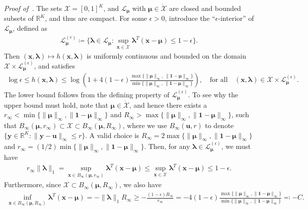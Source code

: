 \documentclass{article}
\theoremstyle{plain}
\theoremstyle{definition}
\newcommand{\lrp}[1]{\left( #1 \right)}
\newcommand{\R}{\mathbb{R}}
\newcommand{\calX}{\mathcal X}
\newcommand{\calL}{\mathcal L}
\newcommand{\uvec}{\mathbf{u}}
\newcommand{\xvec}{\mathbf{x}}
\newcommand{\yvec}{\mathbf{y}}
\newcommand{\qtext}[1]{\quad \text{#1} \quad}
\newcommand{\boldlambda}{\boldsymbol{\lambda}}
\newcommand{\boldmu}{\boldsymbol{\mu}}
\newcommand{\dualdomain}{\calL_{\boldmu}}
\newcommand{\epsdualdomain}{\calL_{\boldmu}^{(\epsilon)}}
\begin{document}
\emph{Proof of~.}
The sets $\calX = [0,1]^K$, and $\calL_{\boldmu}$ with $\boldmu \in \mathring{\calX}$ are closed and bounded subsets of $\R^K$, and thus are compact. For some $\epsilon>0$, introduce the ``$\epsilon$-interior'' of $\dualdomain$, defined as
\begin{align}
    \epsdualdomain \coloneqq \{ \boldlambda \in \dualdomain: \sup_{\xvec\in \calX} \boldlambda^T(\xvec-\boldmu) \leq 1-\epsilon\}.  \label{eq:epsilon-interior}
\end{align}
Then $(\xvec, \boldlambda) \mapsto h(\xvec, \boldlambda)$ is uniformly continuous and bounded on the domain $\calX \times \epsdualdomain$, and satisfies 
\begin{align}
    \log \epsilon \leq h(\xvec, \boldlambda) \leq \log\lrp{1 + 4(1-\epsilon) \frac{\max\{ \|\boldmu\|_\infty, \, \|\boldsymbol{1}-\boldmu\|_\infty \} }{\min\{ \|\boldmu\|_\infty, \, \|\boldsymbol{1}-\boldmu\|_\infty \}} }, \qtext{for all} (\xvec, \boldlambda) \in \calX \times \epsdualdomain. 
\end{align}
The lower bound follows from the defining property of $\epsdualdomain$. To see why the upper bound must hold, note that $\boldmu \in \mathring{\calX}$, and hence there exists a $r_\infty < \min \{\|\boldmu\|_\infty, \|\boldsymbol{1}-\boldmu\|_\infty\}$ and $R_\infty> \max  \{\|\boldmu\|_\infty, \|\boldsymbol{1}-\boldmu\|_\infty\}$, such that $B_\infty(\boldmu, r_\infty) \subset \calX \subset B_\infty(\boldmu, R_\infty)$, where we use $B_\infty(\uvec, r)$ to denote $\{\yvec \in \mathbb{R}^K: \|\yvec-\uvec\|_\infty \leq r\}$.
A valid choice is $R_\infty = 2  \max  \{\|\boldmu\|_\infty, \|\boldsymbol{1}-\boldmu\|_\infty\}$ and $r_\infty = (1/2) \min   \{\|\boldmu\|_\infty, \|\boldsymbol{1}-\boldmu\|_\infty\}$. 
Then, for any $\boldlambda\in \epsdualdomain$, we must have 
\begin{align}
    r_\infty \|\boldlambda\|_1 = \sup_{\xvec \in B_\infty(\boldmu, r_\infty)} \boldlambda^T(\xvec - \boldmu) \leq \sup_{\xvec \in \calX} \boldlambda^T(\xvec - \boldmu)  \leq 1-\epsilon. \label{eq:eps-dual-bound-1}
\end{align}
Furthermore, since $\calX \subset B_\infty(\boldmu, R_\infty)$, we also have 
\begin{align}
    \inf_{\xvec \in B_\infty(\boldmu, R_\infty)} \boldlambda^T(\xvec - \boldmu) = - \|\boldlambda\|_1 R_\infty \geq - \frac{(1-\epsilon) R_\infty}{r_\infty} = -4(1-\epsilon)  \frac{\max  \{\|\boldmu\|_\infty, \|\boldsymbol{1}-\boldmu\|_\infty\}}{ \min  \{\|\boldmu\|_\infty, \|\boldsymbol{1}-\boldmu\|_\infty\}  } \eqcolon -C.  
\end{align}
\end{document}
